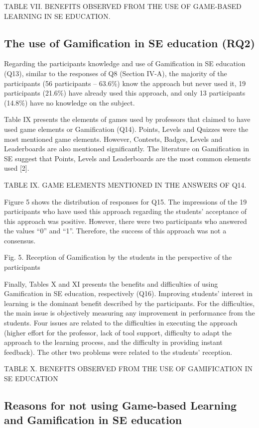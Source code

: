 TABLE VII. BENEFITS OBSERVED FROM THE USE OF GAME-BASED LEARNING IN SE EDUCATION.

\subsection{The use of Gamification in SE education (RQ2)}

Regarding the participants knowledge and use of Gamification in SE education (Q13), similar to the responses of Q8 (Section IV-A), the majority of the participants (56 participants – 63.6\%) know the approach but never used it, 19 participants (21.6\%) have already used this approach, and only 13 participants (14.8\%) have no knowledge on the subject.

Table IX presents the elements of games used by professors that claimed to have used game elements or Gamification (Q14). Points, Levels and Quizzes were the most mentioned game elements. However, Contests, Badges, Levels and Leaderboards are also mentioned significantly. The literature on Gamification in SE suggest that Points, Levels and Leaderboards are the most common elements used [2].

TABLE IX. GAME ELEMENTS MENTIONED IN THE ANSWERS OF Q14.

Figure 5 shows the distribution of responses for Q15. The impressions of the 19 participants who have used this approach regarding the students’ acceptance of this approach was positive. However, there were two participants who answered the values “0” and “1”. Therefore, the success of this approach was not a consensus.
 
Fig. 5. Reception of Gamification by the students in the perspective of the participants

Finally, Tables X and XI presents the benefits and difficulties of using Gamification in SE education, respectively (Q16). Improving students’ interest in learning is the dominant benefit described by the participants. For the difficulties, the main issue is objectively measuring any improvement in performance from the students. Four issues are related to the difficulties in executing the approach (higher effort for the professor, lack of tool support, difficulty to adapt the approach to the learning process, and the difficulty in providing instant feedback). The other two problems were related to the students’ reception.


TABLE X. BENEFITS OBSERVED FROM THE USE OF GAMIFICATION IN SE EDUCATION

\subsection{Reasons for not using Game-based Learning and Gamification in SE education}

